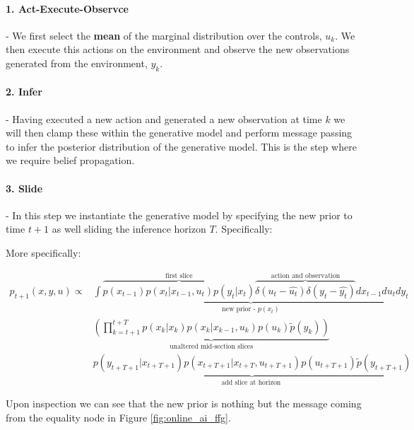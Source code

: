 \documentclass{article}
\begin{document}
\paragraph{1. Act-Execute-Observce} - We first select the \textbf{mean} of the marginal distribution over the controls, $u_k$. We then execute this actions on the environment and observe the new observations generated from the environment, $y_k$.

\paragraph{2. Infer} - Having executed a new action and generated a new observation at time $k$ we will then clamp these within the generative model and perform message passing to infer the posterior distribution of the generative model. This is the step where we require belief propagation.  

\paragraph{3. Slide} - In this step we instantiate the generative model by specifying the new prior to time $t+1$ as well sliding the inference horizon $T$. Specifically:

More specifically:


\begin{equation}
\begin{aligned}
    p_{t+1}(x, y, u) \propto 
    &\underbrace{\int \overbrace{p\left(x_{t-1}\right) p\left(x_t | x_{t-1}, u_t\right) p\left(y_t | x_t\right)}^{\text{first slice}} 
    \overbrace{\delta\left(u_t - \widehat{u_t}\right) \delta\left(y_t - \widehat{y_t}\right)}^{\text{action and observation}} dx_{t-1} du_t dy_t}_{\text{new prior - } p(x_t)} \\
    &\underbrace{\left(\prod_{k=t+1}^{t+T} p\left(x_k | x_k\right) p\left(x_k | x_{k-1}, u_k \right) p\left(u_k\right) \tilde{p}\left(y_k\right)\right)}_{\text{unaltered mid-section slices}} \\
    &\underbrace{p\left(y_{t+T+1} | x_{t+T+1}\right) p\left(x_{t+T+1} | x_{t+T}, u_{t+T+1}\right) p\left(u_{t+T+1}\right) \tilde{p}\left(y_{t+T+1}\right)}_{\text {add slice at horizon }}
\end{aligned}
\end{equation}

Upon inspection we can see that the new prior is nothing but the message coming from the equality node in Figure \ref{fig:online_ai_ffg}. 
\end{document}
